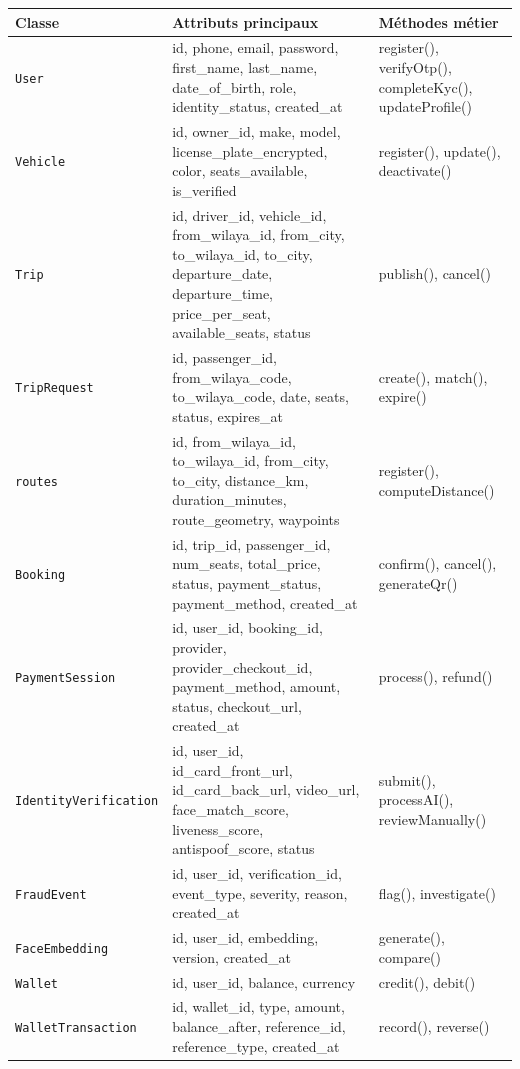 \documentclass[12pt, a4paper, oneside]{report}
\begin{document}
\begin{table}[H]
\centering
\footnotesize
\begin{tabularx}{\textwidth}{|l|X|X|}
\hline
\rowcolor{rohlight}
\textbf{Classe} & \textbf{Attributs principaux} & \textbf{Méthodes métier} \\
\hline
\texttt{User} & id, phone, email, password, first\_name, last\_name, date\_of\_birth, role, identity\_status, created\_at & register(), verifyOtp(), completeKyc(), updateProfile() \\
\hline
\texttt{Vehicle} & id, owner\_id, make, model, license\_plate\_encrypted, color, seats\_available, is\_verified & register(), update(), deactivate() \\
\hline
\texttt{Trip} & id, driver\_id, vehicle\_id, from\_wilaya\_id, from\_city, to\_wilaya\_id, to\_city, departure\_date, departure\_time, price\_per\_seat, available\_seats, status & publish(), cancel() \\
\hline
\texttt{TripRequest} & id, passenger\_id, from\_wilaya\_code, to\_wilaya\_code, date, seats, status, expires\_at & create(), match(), expire() \\
\hline
\texttt{routes} & id, from\_wilaya\_id, to\_wilaya\_id, from\_city, to\_city, distance\_km, duration\_minutes, route\_geometry, waypoints & register(), computeDistance() \\
\hline
\texttt{Booking} & id, trip\_id, passenger\_id, num\_seats, total\_price, status, payment\_status, payment\_method, created\_at & confirm(), cancel(), generateQr() \\
\hline
\texttt{PaymentSession} & id, user\_id, booking\_id, provider, provider\_checkout\_id, payment\_method, amount, status, checkout\_url, created\_at & process(), refund() \\
\hline
\texttt{IdentityVerification} & id, user\_id, id\_card\_front\_url, id\_card\_back\_url, video\_url, face\_match\_score, liveness\_score, antispoof\_score, status & submit(), processAI(), reviewManually() \\
\hline
\texttt{FraudEvent} & id, user\_id, verification\_id, event\_type, severity, reason, created\_at & flag(), investigate() \\
\hline
\texttt{FaceEmbedding} & id, user\_id, embedding, version, created\_at & generate(), compare() \\
\hline
\texttt{Wallet} & id, user\_id, balance, currency & credit(), debit() \\
\hline
\texttt{WalletTransaction} & id, wallet\_id, type, amount, balance\_after, reference\_id, reference\_type, created\_at & record(), reverse() \\

\end{tabularx}
\end{table}
\end{document}
